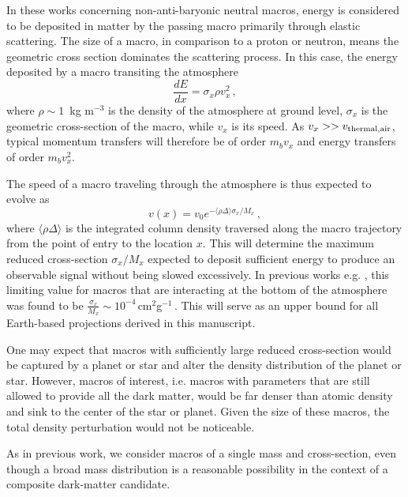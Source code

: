 \documentclass[%
 reprint,
 amsmath,amssymb,
 aps,
]{revtex4-2}
\begin{document}
    In these works concerning non-anti-baryonic neutral macros, energy is considered to be deposited in matter by the passing macro primarily through elastic scattering. The size of a macro, in comparison to a proton or neutron, means the geometric cross section dominates the scattering process. In this case, the energy deposited by a macro transiting the atmosphere 
    \begin{equation}\label{eq:dedx}
        \frac{dE}{dx} = \sigma_x \rho v_x^2\,,
    \end{equation}
    where $\rho \sim 1\,$ kg m$^{-3}$ is the density of the atmosphere at ground level, $\sigma_x$ is the geometric cross-section of the macro,  while $v_x$ is its speed. As $v_{x} >> v_{\rm{thermal, air}}$, typical momentum transfers will therefore be of order $m_b v_{x}$ and energy transfers of order $m_b v_{x}^2$.

    The speed of a macro traveling through the atmosphere is thus expected to evolve as
    \begin{equation}\label{eq:atmo_velocity}
        v(x) = v_{0} e^{-\langle \rho \Delta\rangle \sigma_x/{M_x}}\,,
    \end{equation}
    where $\langle \rho \Delta\rangle$ is the integrated column density traversed along the macro trajectory from the point of entry to the location $x$. This will determine the maximum reduced cross-section $\sigma_x/M_x$ expected to deposit sufficient energy to produce an observable signal without being slowed excessively. In previous works e.g. \citet{Sidhu2019death, Sidhu2019bolide}, this limiting value for macros that are interacting at the bottom of the atmosphere was found to be $\frac{\sigma_x}{M_x} \sim 10^{-4}\,$cm$^2$g$^{-1}\,$. This will serve as an upper bound for all Earth-based projections derived in this manuscript.

    One may expect that macros with sufficiently large reduced cross-section would be captured by a planet or star and alter the density distribution of the planet or star. However, macros of interest, i.e. macros with parameters that are still allowed to provide all the dark matter, would be far denser than atomic density and sink to the center of the star or planet. Given the size of these macros, the total density perturbation would not be noticeable.

    As in previous work, we consider macros of a single mass and cross-section, even though a broad mass distribution is a reasonable possibility in the context of a composite dark-matter candidate.
\end{document}
